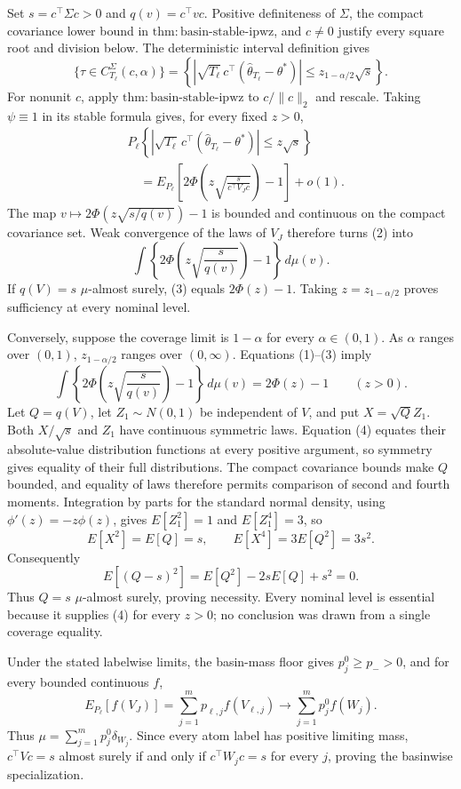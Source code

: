 Set \(s=c^\top\Sigma c>0\) and \(q(v)=c^\top vc\). Positive definiteness of \(\Sigma\), the compact covariance lower bound in \(\mathrm{thm:basin\text{-}stable\text{-}ipwz}\), and \(c\ne0\) justify every square root and division below. The deterministic interval definition gives
\[
 \{\tau\in C_{T_\ell}^{\Sigma}(c,\alpha)\}
 =\left\{\left|\sqrt{T_\ell}\,c^\top(\widehat\theta_{T_\ell}-\theta^*)\right|
 \le z_{1-\alpha/2}\sqrt s\right\}.
\tag{1}
\]
For nonunit \(c\), apply \(\mathrm{thm:basin\text{-}stable\text{-}ipwz}\) to \(c/\|c\|_2\) and rescale. Taking \(\psi\equiv1\) in its stable formula gives, for every fixed \(z>0\),
\[
\begin{aligned}
 &P_\ell\!\left\{\left|\sqrt{T_\ell}\,c^\top
 (\widehat\theta_{T_\ell}-\theta^*)\right|\le z\sqrt s\right\}\\
 &\quad=E_{P_\ell}\!\left[2\Phi\!\left(z\sqrt{\frac{s}{c^\top V_Jc}}\right)-1\right]+o(1).
\end{aligned}
\tag{2}
\]
The map \(v\mapsto2\Phi(z\sqrt{s/q(v)})-1\) is bounded and continuous on the compact covariance set. Weak convergence of the laws of \(V_J\) therefore turns (2) into
\[
 \int\left\{2\Phi\!\left(z\sqrt{\frac{s}{q(v)}}\right)-1\right\}\,d\mu(v).
\tag{3}
\]
If \(q(V)=s\) \(\mu\)-almost surely, (3) equals \(2\Phi(z)-1\). Taking \(z=z_{1-\alpha/2}\) proves sufficiency at every nominal level.

Conversely, suppose the coverage limit is \(1-\alpha\) for every \(\alpha\in(0,1)\). As \(\alpha\) ranges over \((0,1)\), \(z_{1-\alpha/2}\) ranges over \((0,\infty)\). Equations (1)--(3) imply
\[
 \int\left\{2\Phi\!\left(z\sqrt{\frac{s}{q(v)}}\right)-1\right\}\,d\mu(v)
 =2\Phi(z)-1\qquad(z>0).
\tag{4}
\]
Let \(Q=q(V)\), let \(Z_1\sim N(0,1)\) be independent of \(V\), and put \(X=\sqrt QZ_1\). Both \(X/\sqrt s\) and \(Z_1\) have continuous symmetric laws. Equation (4) equates their absolute-value distribution functions at every positive argument, so symmetry gives equality of their full distributions. The compact covariance bounds make \(Q\) bounded, and equality of laws therefore permits comparison of second and fourth moments. Integration by parts for the standard normal density, using \(\phi'(z)=-z\phi(z)\), gives \(E[Z_1^2]=1\) and \(E[Z_1^4]=3\), so
\[
 E[X^2]=E[Q]=s,
 \qquad E[X^4]=3E[Q^2]=3s^2.
\tag{5}
\]
Consequently
\[
 E[(Q-s)^2]=E[Q^2]-2sE[Q]+s^2=0.
\tag{6}
\]
Thus \(Q=s\) \(\mu\)-almost surely, proving necessity. Every nominal level is essential because it supplies (4) for every \(z>0\); no conclusion was drawn from a single coverage equality.

Under the stated labelwise limits, the basin-mass floor gives \(p_j^0\ge p_->0\), and for every bounded continuous \(f\),
\[
 E_{P_\ell}[f(V_J)]=\sum_{j=1}^mp_{\ell,j}f(V_{\ell,j})
 \longrightarrow\sum_{j=1}^mp_j^0f(W_j).
\]
Thus \(\mu=\sum_{j=1}^mp_j^0\delta_{W_j}\). Since every atom label has positive limiting mass, \(c^\top Vc=s\) almost surely if and only if \(c^\top W_jc=s\) for every \(j\), proving the basinwise specialization.